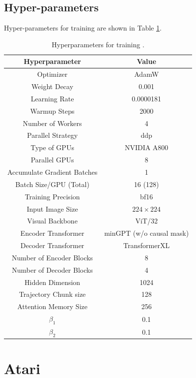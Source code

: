 \subsection{Hyper-parameters}
Hyper-parameters for training \agent are shown in Table \ref{table:parameter}. 

\begin{table}[h]
\centering
\caption{Hyperparameters for training \agent. } \label{table:parameter}
\begin{tabular}{@{}cc@{}}
\toprule
\textbf{Hyperparameter}  & \textbf{Value}   \\ \midrule
Optimizer                & AdamW     \\
Weight Decay             & 0.001     \\
Learning Rate            & 0.0000181 \\
Warmup Steps             & 2000      \\
Number of Workers        & 4         \\
Parallel Strategy        & ddp       \\
Type of GPUs             & NVIDIA A800 \\
Parallel GPUs            & 8         \\
Accumulate Gradient Batches & 1      \\
Batch Size/GPU (Total)   & 16 (128)    \\ 
Training Precision       & bf16      \\
Input Image Size         & $224 \times 224$ \\
Visual Backbone          & ViT/32  \\
Encoder Transformer      & minGPT (w/o causal mask)  \\
Decoder Transformer      & TransformerXL \\
Number of Encoder Blocks & 8         \\
Number of Decoder Blocks & 4         \\
Hidden Dimension         & 1024      \\
Trajectory Chunk size    & 128       \\
Attention Memory Size    & 256       \\
$\beta_1$                & 0.1       \\
$\beta_2$                & 0.1       \\
\bottomrule
\end{tabular}
\end{table}


\section{Atari} \label{appendix:atari}

